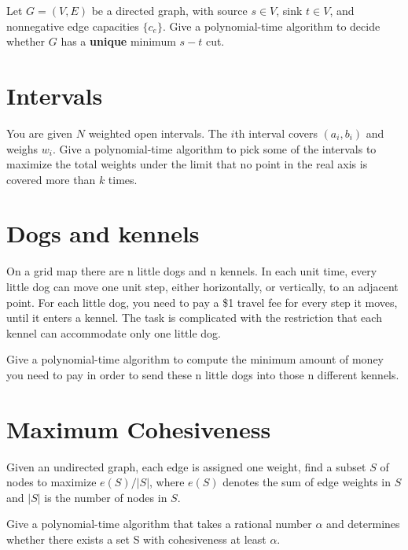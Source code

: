 \documentclass[a4paper,10pt]{article}
\begin{document}
Let $G=(V,E)$ be a directed graph, with source $s\in V$, sink $t\in V$, and nonnegative edge capacities $\{ c_e \}$. Give a polynomial-time algorithm to decide whether $G$ has a {\bf unique} minimum $s-t$ cut.

\section{Intervals}

You are given $N$ weighted open intervals. The $i$th interval covers $(a_i, b_i)$ and weighs $w_i$. Give a polynomial-time algorithm to pick some of the intervals to maximize the total weights under the limit that no point in the real axis is covered more than $k$ times.

\section{Dogs and kennels}

On a grid map there are n little dogs and n kennels. In each unit time, every little dog can move one unit step, either horizontally, or vertically, to an adjacent point. For each little dog, you need to pay a \$1 travel fee for every step it moves, until it enters a kennel. The task is complicated with the restriction that each kennel can accommodate only one little dog.

Give a polynomial-time algorithm to compute the minimum amount of money you need to pay in order to send these n little dogs into those n different kennels. 

\section{Maximum Cohesiveness}

Given an undirected graph, each edge is assigned one weight, find a subset $S$ of nodes to maximize $e(S)/|S|$, where $e(S)$ denotes the sum of edge weights in $S$ and $|S|$ is the number of nodes in $S$.

Give a polynomial-time algorithm that takes a rational number $\alpha$ and determines whether there exists a set S with cohesiveness at least $\alpha$.
 
\end{document}
